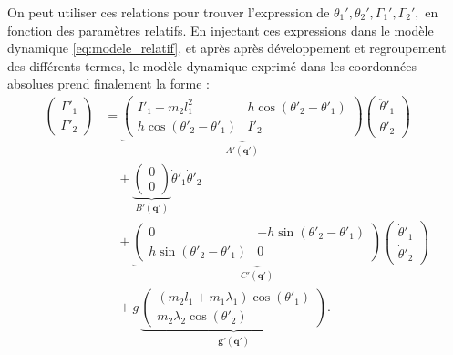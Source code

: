 \documentclass[10pt,a4paper,twocolumn]{article}
\begin{document}
On peut utiliser ces relations pour trouver l'expression 
de $\theta_1', \theta_2', \Gamma_1', \Gamma_2',$ en fonction des paramètres relatifs. 
En injectant ces expressions dans le modèle dynamique \eqref{eq:modele_relatif}, et après
après développement et regroupement des différents termes, le modèle dynamique exprimé dans 
les coordonnées absolues prend finalement la forme :
\begin{equation}
  \begin{aligned}
    \begin{pmatrix}
      \Gamma'_1\\
      \Gamma'_2
    \end{pmatrix}
    &=
    \underbrace{
      \begin{pmatrix}
        I'_1 + m_2l_1^2 & h\cos(\theta'_2-\theta'_1) \\
        h\cos(\theta'_2-\theta'_1) & I'_2
      \end{pmatrix}
    }_{A'(\mathbf{q}')}
    \begin{pmatrix}
      \ddot{\theta}'_1 \\
      \ddot{\theta}'_2
    \end{pmatrix}
    \\[0.5em]
    &\quad+
    \underbrace{
      \begin{pmatrix}
        0 \\
        0
      \end{pmatrix}
    }_{B'(\mathbf{q}')}
    \dot{\theta}'_1\dot{\theta}'_2
    \\[0.5em]
    &\quad+
    \underbrace{
      \begin{pmatrix}
        0 & -h\sin(\theta'_2-\theta'_1) \\
        h\sin(\theta'_2-\theta'_1) & 0
      \end{pmatrix}
    }_{C'(\mathbf{q}')}
    \begin{pmatrix}
      \dot{\theta}'_1\\
      \dot{\theta}'_2
    \end{pmatrix}
    \\[0.5em]
    &\quad+
    g\,
    \underbrace{
      \begin{pmatrix}
        (m_2l_1+m_1\lambda_1)\cos(\theta'_1) \\
        m_2\lambda_2\cos(\theta'_2)
      \end{pmatrix}
    }_{\mathbf{g}'(\mathbf{q}')}.
  \end{aligned}
\label{eq:modele_absolu}
\end{equation}
\end{document}
